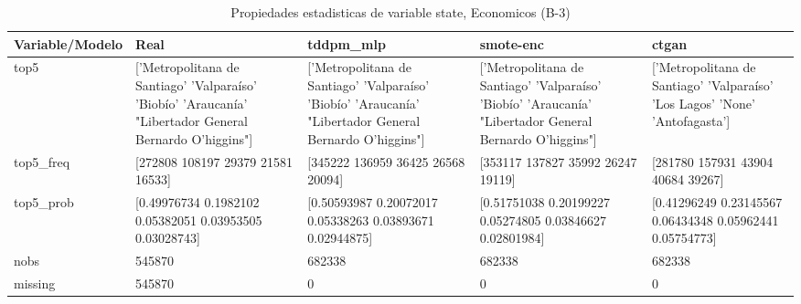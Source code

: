 \begin{table}[H]
\centering
\fontsize{8}{14}\selectfont
\caption{Propiedades  estadisticas de variable state, Economicos (B-3)}
\label{table-stats-economicos-b-3-state}
\begin{tabular}{|l|m{10em}|m{10em}|m{10em}|m{10em}|}
\hline
 \rowcolor[gray]{0.8}
Variable/Modelo & Real & tddpm\_mlp & smote-enc & ctgan \\
\hline top5 & ['Metropolitana de Santiago' 'Valparaíso' 'Biobío' 'Araucanía'
 "Libertador General Bernardo O'higgins"] & ['Metropolitana de Santiago' 'Valparaíso' 'Biobío' 'Araucanía'
 "Libertador General Bernardo O'higgins"] & ['Metropolitana de Santiago' 'Valparaíso' 'Biobío' 'Araucanía'
 "Libertador General Bernardo O'higgins"] & ['Metropolitana de Santiago' 'Valparaíso' 'Los Lagos' 'None' 'Antofagasta'] \\
\hline top5\_freq & [272808 108197  29379  21581  16533] & [345222 136959  36425  26568  20094] & [353117 137827  35992  26247  19119] & [281780 157931  43904  40684  39267] \\
\hline top5\_prob & [0.49976734 0.1982102  0.05382051 0.03953505 0.03028743] & [0.50593987 0.20072017 0.05338263 0.03893671 0.02944875] & [0.51751038 0.20199227 0.05274805 0.03846627 0.02801984] & [0.41296249 0.23145567 0.06434348 0.05962441 0.05754773] \\
\hline nobs & 545870 & 682338 & 682338 & 682338 \\
\hline missing & 545870 & 0 & 0 & 0 \\
\hline
\end{tabular}
\end{table}
